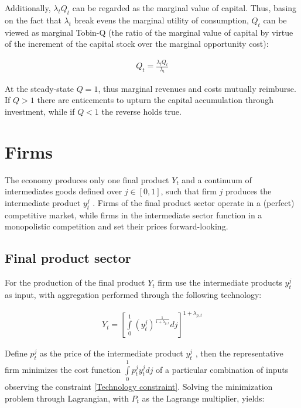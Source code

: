 \documentclass{pracamgr}
\numberwithin{equation}{section}
\begin{document}
Additionally, $\lambda_{t} Q_{t}$ can be regarded as the marginal value of capital. Thus, basing on the fact that $\lambda_{t}$ break evens the marginal utility of consumption, $Q_{t}$ can be viewed as marginal Tobin-Q (the ratio of the marginal value of capital by virtue of the increment of the capital stock over the marginal opportunity cost):

\begin{align}
Q_{t} = \frac{\lambda_{t} Q_{t}}{\lambda_{t}}
\end{align}

At the steady-state $Q=1$, thus marginal revenues and costs mutually reimburse. If $Q>1$ there are enticements to upturn the capital accumulation through investment, while if $Q<1$ the reverse holds true.

\section{Firms} \label{DSGE - Firms}

The economy produces only one final product $Y_{t}$ and a continuum of intermediates goods defined over $j \in [0,1]$, such that firm $j$ produces the intermediate product $y_{t}^{j}$ . Firms of the final product sector operate in a (perfect) competitive market, while firms in the intermediate sector function in a monopolistic competition and set their prices forward-looking.

\subsection{Final product sector} \label{DSGE - Firms- Final product sector}

For the production of the final product $Y_{t}$ firm use the intermediate products $y_{t}^{j}$ as input, with aggregation performed through the following technology:

\begin{align} \label{Technology constraint}
Y_{t} = \left[ \int\limits_{0}^{1} \left(y_{t}^{j} \right)^\frac{1}{1+\lambda_{p,t}} dj \right]^{1+\lambda_{p,t}}
\end{align}

Define $p_{t}^{j}$ as the price of the intermediate product $y_{t}^{j}$ , then the representative firm minimizes the cost function $\int\limits_{0}^{1} p_{t}^{j} y_{t}^{j}dj$ of a particular combination of inputs observing the constraint \ref{Technology constraint}. Solving the minimization problem through Lagrangian, with $P_{t}$ as the Lagrange multiplier, yields:
\end{document}
